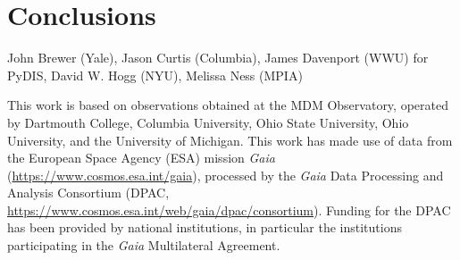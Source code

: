 \documentclass[modern, letterpaper]{aastex61}
\begin{document}
\section{Conclusions }

\acknowledgements
John Brewer (Yale),
Jason Curtis (Columbia),
James Davenport (WWU) for PyDIS,
David W. Hogg (NYU),
Melissa Ness (MPIA)

This work is based on observations obtained at the MDM Observatory, operated by
Dartmouth College, Columbia University, Ohio State University, Ohio University,
and the University of Michigan.
This work has made use of data from the European Space Agency (ESA)
mission {\it Gaia} (\url{https://www.cosmos.esa.int/gaia}), processed by
the {\it Gaia} Data Processing and Analysis Consortium (DPAC,
\url{https://www.cosmos.esa.int/web/gaia/dpac/consortium}). Funding
for the DPAC has been provided by national institutions, in particular
the institutions participating in the {\it Gaia} Multilateral Agreement.





\end{document}
